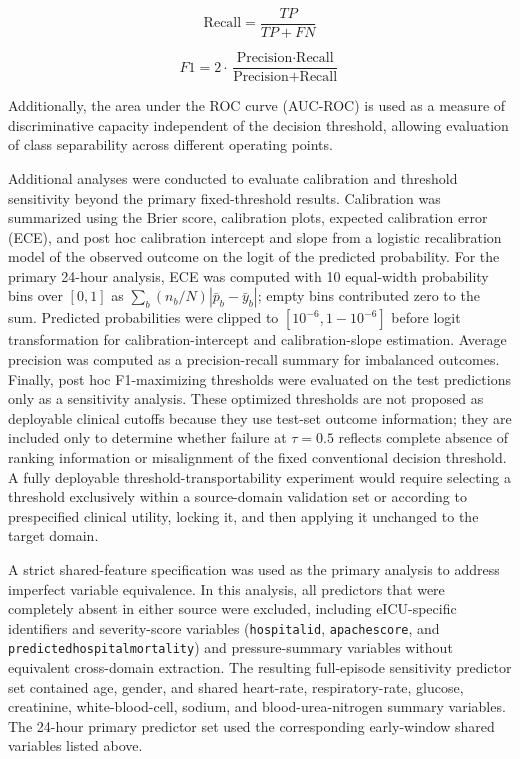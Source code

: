 \documentclass[utf8]{FrontiersinHarvard} %
\begin{document}
\begin{equation}
	\text{Recall} =
	\frac{TP}{TP + FN}
	\label{eq:recall_metric}
\end{equation}

\begin{equation}
	F1 =
	2 \cdot
	\frac{\text{Precision} \cdot \text{Recall}}{\text{Precision} + \text{Recall}}
	\label{eq:f1_metric}
\end{equation}

Additionally, the area under the ROC curve (AUC-ROC) is used as a measure of discriminative capacity independent of the decision threshold, allowing evaluation of class separability across different operating points.

Additional analyses were conducted to evaluate calibration and threshold sensitivity beyond the primary fixed-threshold results. Calibration was summarized using the Brier score, calibration plots, expected calibration error (ECE), and post hoc calibration intercept and slope from a logistic recalibration model of the observed outcome on the logit of the predicted probability. For the primary 24-hour analysis, ECE was computed with 10 equal-width probability bins over $[0,1]$ as $\sum_b (n_b/N)|\bar{p}_b-\bar{y}_b|$; empty bins contributed zero to the sum. Predicted probabilities were clipped to $[10^{-6},1-10^{-6}]$ before logit transformation for calibration-intercept and calibration-slope estimation. Average precision was computed as a precision-recall summary for imbalanced outcomes. Finally, post hoc F1-maximizing thresholds were evaluated on the test predictions only as a sensitivity analysis. These optimized thresholds are not proposed as deployable clinical cutoffs because they use test-set outcome information; they are included only to determine whether failure at $\tau=0.5$ reflects complete absence of ranking information or misalignment of the fixed conventional decision threshold. A fully deployable threshold-transportability experiment would require selecting a threshold exclusively within a source-domain validation set or according to prespecified clinical utility, locking it, and then applying it unchanged to the target domain.

A strict shared-feature specification was used as the primary analysis to address imperfect variable equivalence. In this analysis, all predictors that were completely absent in either source were excluded, including eICU-specific identifiers and severity-score variables (\texttt{hospitalid}, \texttt{apachescore}, and \texttt{predictedhospitalmortality}) and pressure-summary variables without equivalent cross-domain extraction. The resulting full-episode sensitivity predictor set contained age, gender, and shared heart-rate, respiratory-rate, glucose, creatinine, white-blood-cell, sodium, and blood-urea-nitrogen summary variables. The 24-hour primary predictor set used the corresponding early-window shared variables listed above.
\end{document}
